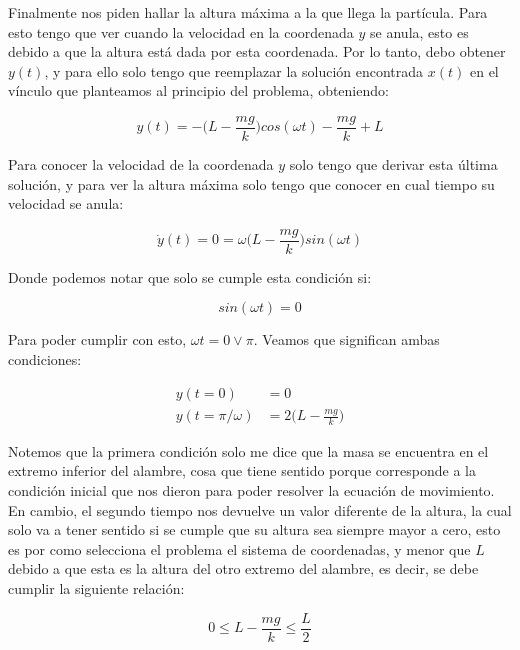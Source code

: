 \documentclass{article}
\begin{document}
\begin{multicols}{2}
Finalmente nos piden hallar la altura máxima a la que llega la partícula. Para esto tengo que ver cuando la velocidad en la coordenada $y$ se anula, esto es debido a que la altura está dada por esta coordenada. Por lo tanto,  debo obtener $y(t)$, y para ello solo tengo que reemplazar la solución encontrada $x(t)$ en el vínculo que planteamos al principio del problema, obteniendo:

\begin{equation}
    y(t) = - \bigg( L - \frac{mg}{k} \bigg)cos(\omega t) - \frac{mg}{k} + L
\end{equation}

Para conocer la velocidad de la coordenada $y$ solo tengo que derivar esta última solución, y para ver la altura máxima solo tengo que conocer en cual tiempo su velocidad se anula:

\begin{equation}
    \dot{y}(t) = 0 = \omega \bigg(L - \frac{mg}{k}\bigg)sin(\omega t)
\end{equation}

Donde podemos notar que solo se cumple esta condición si:

\begin{equation}
    sin(\omega t) = 0
\end{equation}

Para poder cumplir con esto, $\omega t = 0 \vee \pi$. Veamos que significan ambas condiciones:

\begin{equation}
    \begin{split}
        y(t = 0) &= 0 \\
        y(t = \pi/\omega) &= 2 \bigg( L - \frac{mg}{k} \bigg)
    \end{split}
\end{equation}

Notemos que la primera condición solo me dice que la masa se encuentra en el extremo inferior del alambre, cosa que tiene sentido porque corresponde a la condición inicial que nos dieron para poder resolver la ecuación de movimiento. En cambio, el segundo tiempo nos devuelve un valor diferente de la altura, la cual solo va a tener sentido si se cumple que su altura sea siempre mayor a cero, esto es por como selecciona el problema el sistema de coordenadas, y menor que $L$ debido a que esta es la altura del otro extremo del alambre, es decir, se debe cumplir la siguiente relación:

\begin{equation}
    0 \leq L - \frac{mg}{k} \leq \frac{L}{2}
\end{equation}

\end{multicols}
\end{document}
